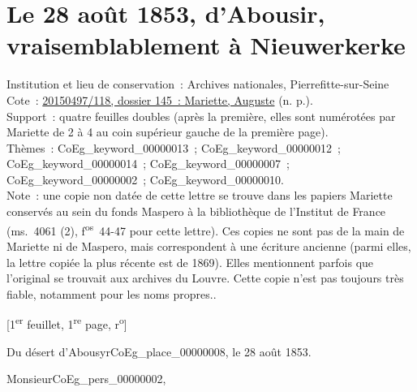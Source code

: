 \documentclass{book}
\begin{document}
\section*{Le 28 août 1853, d’Abousir, vraisemblablement à Nieuwerkerke}  
{\footnotesize \noindent Institution et lieu de conservation~: Archives nationales, Pierrefitte-sur-Seine\\
Cote~: \hyperlink{CoEg_Mariette_ms_001}{20150497/118, dossier 145~: Mariette, Auguste} (n. p.).\\
Support~: quatre feuilles doubles (après la première, elles sont numérotées par Mariette de 2 à 4 au coin supérieur gauche de la première page).\\
Thèmes~: \gls{CoEg_keyword_00000013}~; \gls{CoEg_keyword_00000012}~; \gls{CoEg_keyword_00000014}~; \gls{CoEg_keyword_00000007}~;
\gls{CoEg_keyword_00000002}~; \gls{CoEg_keyword_00000010}.\\
Note~: une copie non datée de cette lettre se trouve dans les papiers Mariette conservés au sein du fonds Maspero à la bibliothèque de l’Institut de France (ms.~4061 (2), f\textsuperscript{os}~44-47 pour cette lettre). Ces copies ne sont pas de la main de Mariette ni de Maspero, mais correspondent à une écriture ancienne (parmi elles, la lettre copiée la plus récente est de 1869). Elles mentionnent parfois que l’original se trouvait aux archives du Louvre. Cette copie n’est pas toujours très fiable, notamment pour les noms propres..
\begin{center} {[1\textsuperscript{er} feuillet, 1\textsuperscript{re} page, r\textsuperscript{o}]}\end{center}}
\begin{flushright}Du désert d’Abousyr\gls{CoEg_place_00000008}, le 28 août 1853.\end{flushright}

\hspace{1cm} Monsieur\gls{CoEg_pers_00000002},\\
\end{document}
